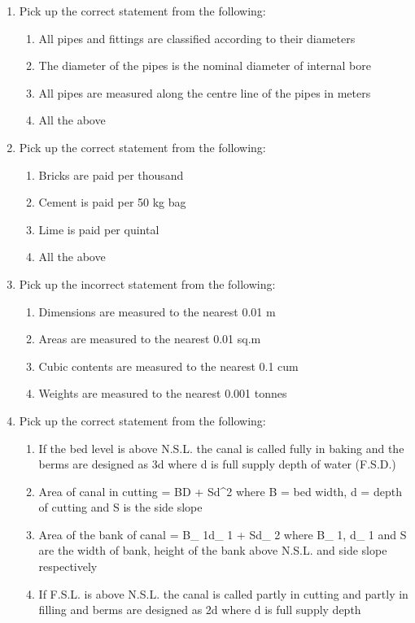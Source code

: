 \documentclass[11pt,a4paper]{article}
\begin{document}
\begin{enumerate}
\begin{enumerate*}[itemjoin=\qquad, label=\Alph*.]
\end{enumerate*}
\item{Pick up the correct statement from the following:}
\begin{enumerate}[label=\Alph*.]
\item{All pipes and fittings are classified according to their diameters}
\item{The diameter of the pipes is the nominal diameter of internal bore}
\item{All pipes are measured along the centre line of the pipes in meters}
\item{All the above}
\end{enumerate}
\item{Pick up the correct statement from the following:}
\begin{enumerate}[label=\Alph*.]
\item{Bricks are paid per thousand}
\item{Cement is paid per 50 kg bag}
\item{Lime is paid per quintal}
\item{All the above}
\end{enumerate}
\item{Pick up the incorrect statement from the following:}
\begin{enumerate}[label=\Alph*.]
\item{Dimensions are measured to the nearest 0.01 m}
\item{Areas are measured to the nearest 0.01 sq.m}
\item{Cubic contents are measured to the nearest 0.1 cum}
\item{Weights are measured to the nearest 0.001 tonnes}
\end{enumerate}
\item{Pick up the correct statement from the following:}
\begin{enumerate}[label=\Alph*.]
\item{If the bed level is above N.S.L. the canal is called fully in baking and the berms are designed as 3d where d is full supply depth of water (F.S.D.)}
\item{Area of canal in cutting = BD + Sd\^{}2 where B = bed width, d = depth of cutting and S is the side slope}
\item{Area of the bank of canal = B\_ 1d\_ 1 + Sd\_ 2 where B\_ 1, d\_ 1 and S are the width of bank, height of the bank above N.S.L. and side slope respectively}
\item{If F.S.L. is above N.S.L. the canal is called partly in cutting and partly in filling and berms are designed as 2d where d is full supply depth}

\end{enumerate}
\end{enumerate}
\end{document}
